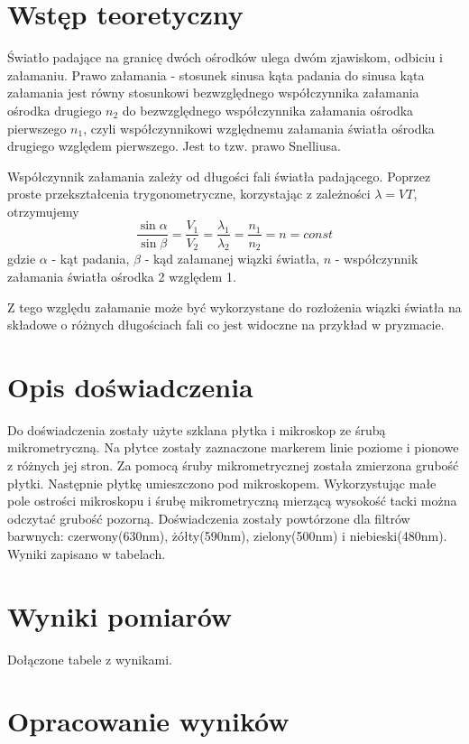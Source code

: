 \documentclass[a4paper,10pt,twoside]{article}
\begin{document}
\section{Wstęp teoretyczny}
Światło padające na granicę dwóch ośrodków ulega dwóm zjawiskom, odbiciu i załamaniu.
Prawo załamania - stosunek sinusa kąta padania do sinusa kąta załamania jest równy stosunkowi bezwzględnego współczynnika
załamania ośrodka drugiego $n_2$ do bezwzględnego współczynnika załamania ośrodka pierwszego $n_1$, czyli współczynnikowi
względnemu załamania światła ośrodka drugiego względem pierwszego. Jest to tzw. prawo Snelliusa.

Współczynnik załamania zależy od długości fali światła padającego. Poprzez proste przekształcenia trygonometryczne, korzystając
z zależności $\lambda = VT$, otrzymujemy
\begin{equation}
\frac{\sin\alpha}{\sin\beta}=\frac{V_1}{V_2}=\frac{\lambda_1}{\lambda_2}=\frac{n_1}{n_2}=n=const
\end{equation}
gdzie $\alpha$ - kąt padania, $\beta$ - kąd załamanej wiązki światła, $n$ - współczynnik załamania światła ośrodka 2 względem 1.

Z tego względu załamanie może być wykorzystane do rozłożenia wiązki światła na składowe o różnych długościach fali co jest
widoczne na przykład w pryzmacie.
	
\section{Opis doświadczenia}
Do doświadczenia zostały użyte szklana płytka i mikroskop ze śrubą mikrometryczną. Na płytce zostały zaznaczone markerem linie
poziome i pionowe z różnych jej stron. Za pomocą śruby mikrometrycznej została zmierzona grubość płytki. Następnie płytkę
umieszczono pod mikroskopem. Wykorzystując małe pole ostrości mikroskopu i śrubę mikrometryczną mierzącą wysokość tacki można
odczytać grubość pozorną. Doświadczenia zostały powtórzone dla filtrów barwnych: czerwony(630nm), żółty(590nm),
zielony(500nm) i niebieski(480nm). Wyniki zapisano w tabelach.

\section{Wyniki pomiarów}
Dołączone tabele z wynikami.

\newpage
\section{Opracowanie wyników}
\end{document}
